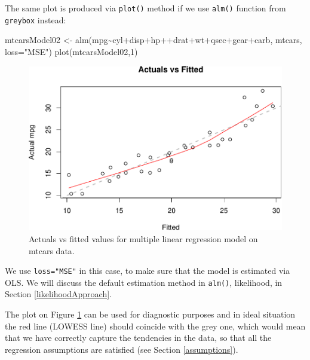\documentclass[
]{book}
\newenvironment{Shaded}{\begin{snugshade}}{\end{snugshade}}
\newcommand{\AttributeTok}[1]{\textcolor[rgb]{0.77,0.63,0.00}{#1}}
\newcommand{\DecValTok}[1]{\textcolor[rgb]{0.00,0.00,0.81}{#1}}
\newcommand{\FunctionTok}[1]{\textcolor[rgb]{0.00,0.00,0.00}{#1}}
\newcommand{\NormalTok}[1]{#1}
\newcommand{\OtherTok}[1]{\textcolor[rgb]{0.56,0.35,0.01}{#1}}
\newcommand{\SpecialCharTok}[1]{\textcolor[rgb]{0.00,0.00,0.00}{#1}}
\newcommand{\StringTok}[1]{\textcolor[rgb]{0.31,0.60,0.02}{#1}}
\theoremstyle{definition}
\theoremstyle{definition}
\theoremstyle{definition}
\theoremstyle{definition}
\theoremstyle{remark}
\begin{document}
The same plot is produced via \texttt{plot()} method if we use \texttt{alm()} function from \texttt{greybox} instead:

\begin{Shaded}
\begin{Highlighting}[]
\NormalTok{mtcarsModel02 }\OtherTok{\textless{}{-}} \FunctionTok{alm}\NormalTok{(mpg}\SpecialCharTok{\textasciitilde{}}\NormalTok{cyl}\SpecialCharTok{+}\NormalTok{disp}\SpecialCharTok{+}\NormalTok{hp}\SpecialCharTok{++}\NormalTok{drat}\SpecialCharTok{+}\NormalTok{wt}\SpecialCharTok{+}\NormalTok{qsec}\SpecialCharTok{+}\NormalTok{gear}\SpecialCharTok{+}\NormalTok{carb, mtcars, }\AttributeTok{loss=}\StringTok{"MSE"}\NormalTok{)}
\FunctionTok{plot}\NormalTok{(mtcarsModel02,}\DecValTok{1}\NormalTok{)}
\end{Highlighting}
\end{Shaded}

\begin{figure}
\centering
\includegraphics{Svetunkov---Statistics-for-Business-Analytics_files/figure-latex/mtcarsModel02Plot-1.pdf}
\caption{\label{fig:mtcarsModel02Plot}Actuals vs fitted values for multiple linear regression model on mtcars data.}
\end{figure}

We use \texttt{loss="MSE"} in this case, to make sure that the model is estimated via OLS. We will discuss the default estimation method in \texttt{alm()}, likelihood, in Section \ref{likelihoodApproach}.

The plot on Figure \ref{fig:mtcarsModel02Plot} can be used for diagnostic purposes and in ideal situation the red line (LOWESS line) should coincide with the grey one, which would mean that we have correctly capture the tendencies in the data, so that all the regression assumptions are satisfied (see Section \ref{assumptions}).
\end{document}
